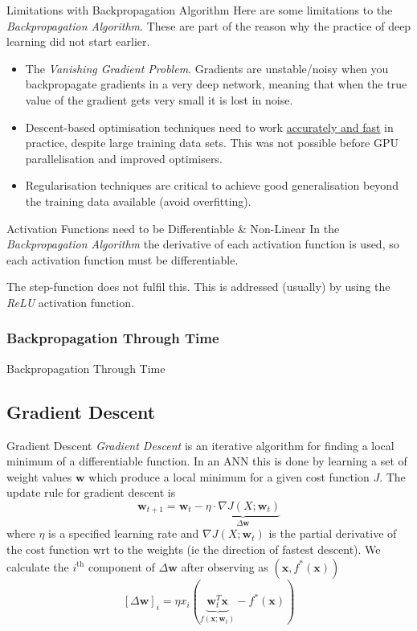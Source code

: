 \documentclass[11pt,a4paper]{article}
\begin{document}
  \begin{remark}{Limitations with Backpropagation Algorithm}
    Here are some limitations to the \textit{Backpropagation Algorithm}. These are part of the reason why the practice of deep learning did not start earlier.
    \begin{itemize}
      \item The \textit{Vanishing Gradient Problem}. Gradients are unstable/noisy when you backpropagate gradients in a very deep network, meaning that when the true value of the gradient gets very small it is lost in noise.
      \item Descent-based optimisation techniques need to work \underline{accurately and fast} in practice, despite large training data sets. This was not possible before GPU parallelisation and improved optimisers.
      \item Regularisation techniques are critical to achieve good generalisation beyond the training data available (avoid overfitting).
    \end{itemize}
  \end{remark}

  \begin{remark}{Activation Functions need to be Differentiable \& Non-Linear}
    In the \textit{Backpropagation Algorithm} the derivative of each activation function is used, so each activation function must be differentiable.
    \par The step-function does not fulfil this. This is addressed (usually) by using the \textit{ReLU} activation function.
  \end{remark}

\subsubsection{Backpropagation Through Time}

  \begin{proposition}{Backpropagation Through Time}
  \end{proposition}

\subsection{Gradient Descent} \label{sec_GradientDescent}

  \begin{definition}{Gradient Descent}
    \textit{Gradient Descent} is an iterative algorithm for finding a local minimum of a differentiable function. In an ANN this is done by learning a set of weight values $\pmb{w}$ which produce a local minimum for a given cost function $J$. The update rule for gradient descent is
    \[ \pmb{w}_{t+1}=\pmb{w}_t-\underbrace{\eta\cdot\nabla J(X;\pmb{w}_t)}_{\Delta\pmb{w}} \]
    where $\eta$ is a specified learning rate and $\nabla J(X;\pmb{w}_t)$ is the partial derivative of the cost function wrt to the weights (ie the direction of fastest descent). We calculate the $i^\text{th}$ component of $\Delta\pmb{w}$ after observing as $(\pmb{x},f^*(\pmb{x}))$
    \[ [\Delta\pmb{w}]_i=\eta x_i(\underbrace{\pmb{w}^T_t\pmb{x}}_{f(\pmb{x};\pmb{w}_t)}-f^*(\pmb{x})) \]
  \end{definition}
\end{document}
